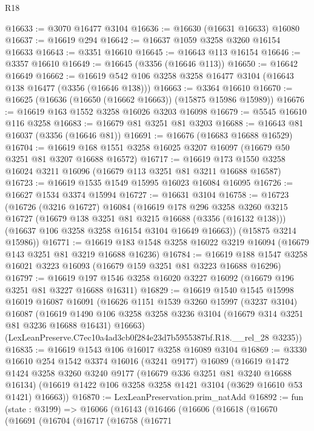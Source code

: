\begin{lexlean}{R18}
\begin{coremodule}
@16633 := @3070 @16477 @3104
@16636 := @16630 (@16631 @16633) @16080
@16637 := @16619 @294
@16642 := @16637 @1059 @3258 @3260 @16154 @16633
@16643 := @3351 @16610
@16645 := @16643 @113 @16154
@16646 := @3357 @16610
@16649 := @16645 (@3356 (@16646 @113))
@16650 := @16642 @16649
@16662 := @16619 @542 @106 @3258 @3258 @16477 @3104 (@16643 @138 @16477 (@3356 (@16646 @138)))
@16663 := @3364 @16610
@16670 := @16625 (@16636 (@16650 (@16662 @16663)) (@15875 @15986 @15989))
@16676 := @16619 @163 @1552 @3258 @16026 @3203 @16098
@16679 := @5545 @16610 @116 @3258
@16683 := @16679 @81 @3251 @81 @3203
@16688 := @16643 @81 @16037 (@3356 (@16646 @81))
@16691 := @16676 (@16683 @16688 @16529)
@16704 := @16619 @168 @1551 @3258 @16025 @3207 @16097 (@16679 @50 @3251 @81 @3207 @16688 @16572)
@16717 := @16619 @173 @1550 @3258 @16024 @3211 @16096 (@16679 @113 @3251 @81 @3211 @16688 @16587)
@16723 := @16619 @1535 @1549 @15995 @16023 @16084 @16095
@16726 := @16627 @1534 @3374 @15994
@16727 := @16631 @3104
@16758 := @16723
    (@16726
      (@3216 @16727)
      @16084
      (@16619
        @178
        @296
        @3258
        @3260
        @3215
        @16727
        (@16679 @138 @3251 @81 @3215 @16688 (@3356 (@16132 @138)))
        (@16637 @106 @3258 @3258 @16154 @3104 @16649 @16663))
      (@15875 @3214 @15986))
@16771 := @16619 @183 @1548 @3258 @16022 @3219 @16094 (@16679 @143 @3251 @81 @3219 @16688 @16236)
@16784 := @16619 @188 @1547 @3258 @16021 @3223 @16093 (@16679 @159 @3251 @81 @3223 @16688 @16296)
@16797 := @16619 @197 @1546 @3258 @16020 @3227 @16092 (@16679 @196 @3251 @81 @3227 @16688 @16311)
@16829 := @16619
    @1540
    @1545
    @15998
    @16019
    @16087
    @16091
    (@16626
      @1151
      @1539
      @3260
      @15997
      (@3237 @3104)
      @16087
      (@16619 @1490 @106 @3258 @3258 @3236 @3104 (@16679 @314 @3251 @81 @3236 @16688 @16431) @16663)
      (LexLeanPreserve.C7ec10a4ad3cb0f284e23d7b5955387bf.R18.__rel_28 @3235))
@16835 := @16619 @1543 @106 @16017 @3258 @16089 @3104
@16869 := @3330
    @16610
    @254
    @1542
    @3374
    @16016
    (@3241 @9177)
    @16089
    (@16619
      @1472
      @1424
      @3258
      @3260
      @3240
      @9177
      (@16679 @336 @3251 @81 @3240 @16688 @16134)
      (@16619 @1422 @106 @3258 @3258 @1421 @3104 (@3629 @16610 @53 @1421) @16663))
@16870 := LexLeanPreservation.prim_natAdd
@16892 := fun (state : @3199) =>
  @16066
    (@16143
      (@16466
        (@16606
          (@16618
            (@16670
              (@16691
                (@16704
                  (@16717
                    (@16758
                      (@16771

\end{coremodule}
\end{lexlean}
